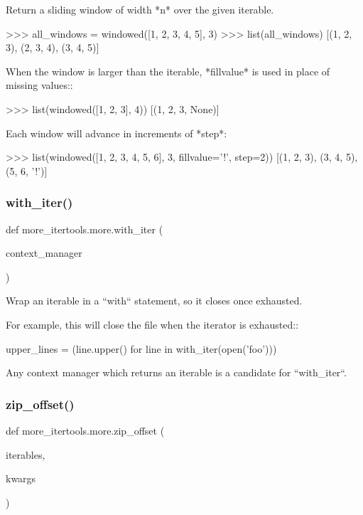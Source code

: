 \begin{DoxyVerb}Return a sliding window of width *n* over the given iterable.

    >>> all_windows = windowed([1, 2, 3, 4, 5], 3)
    >>> list(all_windows)
    [(1, 2, 3), (2, 3, 4), (3, 4, 5)]

When the window is larger than the iterable, *fillvalue* is used in place
of missing values::

    >>> list(windowed([1, 2, 3], 4))
    [(1, 2, 3, None)]

Each window will advance in increments of *step*:

    >>> list(windowed([1, 2, 3, 4, 5, 6], 3, fillvalue='!', step=2))
    [(1, 2, 3), (3, 4, 5), (5, 6, '!')]\end{DoxyVerb}
 \mbox{\label{namespacemore__itertools_1_1more_ae3315463ad9b84adbec0866ec2103519}} 
\subsubsection{\texorpdfstring{with\+\_\+iter()}{with\_iter()}}
{\footnotesize\ttfamily def more\+\_\+itertools.\+more.\+with\+\_\+iter (\begin{DoxyParamCaption}\item[{}]{context\+\_\+manager }\end{DoxyParamCaption})}

\begin{DoxyVerb}Wrap an iterable in a ``with`` statement, so it closes once exhausted.

For example, this will close the file when the iterator is exhausted::

    upper_lines = (line.upper() for line in with_iter(open('foo')))

Any context manager which returns an iterable is a candidate for
``with_iter``.\end{DoxyVerb}
 \mbox{\label{namespacemore__itertools_1_1more_a9898bce28b34ec9ed161170fe2ee6151}} 
\subsubsection{\texorpdfstring{zip\+\_\+offset()}{zip\_offset()}}
{\footnotesize\ttfamily def more\+\_\+itertools.\+more.\+zip\+\_\+offset (\begin{DoxyParamCaption}\item[{}]{iterables,  }\item[{}]{kwargs }\end{DoxyParamCaption})}

